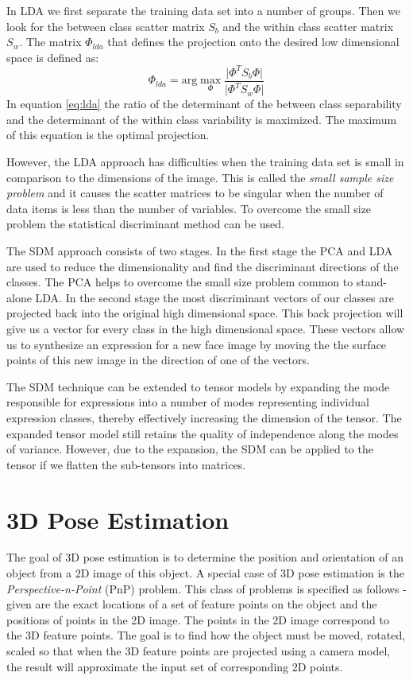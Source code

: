 \documentclass[11pt,a4paper,twoside]{report}
\begin{document}
In LDA we first separate the training data set into a number of groups. Then we
look for the between class scatter matrix $S_b$ and the within class scatter
matrix $S_w$. The matrix $\Phi_{lda}$ that defines the projection onto the desired low dimensional
space is defined as:
\begin{equation} \label{eq:lda}
\Phi_{lda} = \textrm{arg} \max_{\Phi}\frac{\lvert \Phi^T S_b \Phi \rvert}{\lvert \Phi^T S_w \Phi \rvert}
\end{equation}
In equation \ref{eq:lda} the ratio of the determinant of the between class
separability and the determinant of the within class variability is
maximized. The maximum of this equation is the optimal projection.

However, the LDA approach has difficulties when the training data set is small
in comparison to the dimensions of the image. This is called the \textit{small
sample size problem} and it causes the scatter matrices to be singular when the
number of data items is less than the number of variables. To overcome the small size problem the statistical discriminant method can be used.

The SDM approach consists of two stages. In the first stage the PCA
and LDA are used to reduce the dimensionality and find the discriminant
directions of the classes. The PCA helps to overcome the small size problem
common to stand-alone LDA. In the second stage the most discriminant vectors of
our classes are projected back into the original high dimensional space. This
back projection will give us a vector for every class in the high dimensional
space. These vectors allow us to synthesize an expression for a new face image by moving the the surface
points of this new image in the direction of one of the vectors. 

The SDM technique can be extended to tensor models by expanding the mode
responsible for expressions into a number of modes representing
individual expression classes, thereby effectively increasing the dimension of
the tensor. The expanded tensor model still retains the quality of independence
along the modes of variance. However, due to the expansion, the SDM can be
applied to the tensor if we flatten the sub-tensors into matrices.

\section{3D Pose Estimation}\label{s:3dpose}
The goal of 3D pose estimation is to determine the position and orientation of
an object from a 2D image of this object. A special case of 3D pose estimation is
the \textit{Perspective-n-Point} (PnP) problem. This class of problems is specified as follows -
given are the exact locations of a set of feature points on the object and the
positions of points in the 2D
image. The points in the 2D image correspond to the 3D feature points. The goal
is to find how the object must be moved, rotated, scaled so that when the
3D feature points are projected using a camera model, the result will approximate
the input set of corresponding 2D points.  
\end{document}
